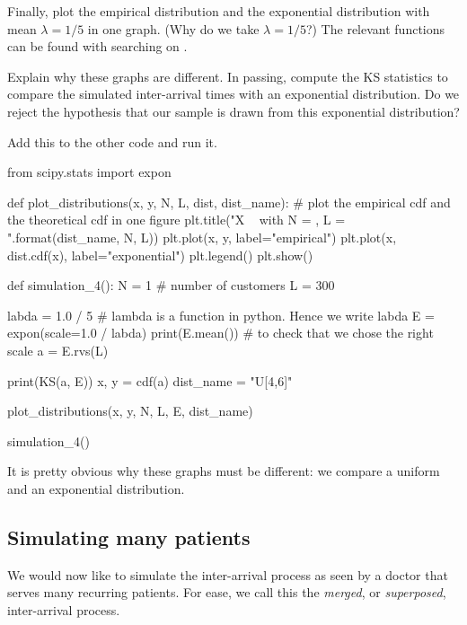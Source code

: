 \begin{exercise}
  Finally, plot the empirical distribution and the exponential distribution with mean $\lambda=1/5$ in one graph.
  (Why do we take $\lambda=1/5$?) The relevant  functions can be found with searching on .

  Explain why these graphs are different.
  In passing, compute the KS statistics to compare the simulated inter-arrival times with an exponential distribution.
  Do we reject the hypothesis that our sample is drawn from this exponential distribution?

\begin{solution}
Add this to the other code and run it.
\begin{pyverbatim}
from scipy.stats import expon


def plot_distributions(x, y, N, L, dist, dist_name):
    # plot the empirical cdf and the theoretical cdf in one figure
    plt.title("X ~ {} with N = {}, L = {}".format(dist_name, N, L))
    plt.plot(x, y, label="empirical")
    plt.plot(x, dist.cdf(x), label="exponential")
    plt.legend()
    plt.show()


def simulation_4():
    N = 1  # number of customers
    L = 300

    labda = 1.0 / 5  # lambda is a function in python. Hence we write labda
    E = expon(scale=1.0 / labda)
    print(E.mean())  # to check that we chose the right scale
    a = E.rvs(L)

    print(KS(a, E))
    x, y = cdf(a)
    dist_name = "U[4,6]"

    plot_distributions(x, y, N, L, E, dist_name)


simulation_4()
\end{pyverbatim}

It is pretty obvious why these graphs must be different: we compare a uniform and an exponential distribution.
\end{solution}
\end{exercise}


\subsection{Simulating many patients}
\label{sec:simul-many-cust}

We would now like to simulate the inter-arrival process as seen by a doctor that serves many recurring patients.
For ease, we call this the \emph{merged}, or \emph{superposed}, inter-arrival process.

